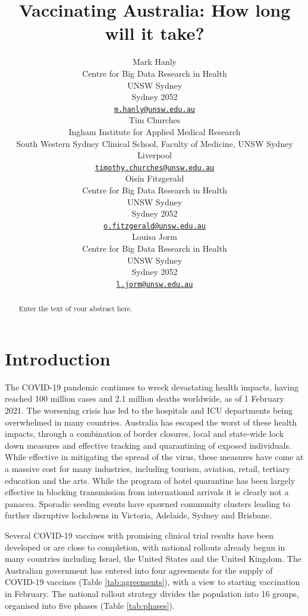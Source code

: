 \documentclass{article}
\title{Vaccinating Australia: How long will it take?}
\author{
    Mark Hanly
   \\
    Centre for Big Data Research in Health \\
    UNSW Sydney \\
  Sydney 2052 \\
  \texttt{\href{mailto:m.hanly@unsw.edu.au}{\nolinkurl{m.hanly@unsw.edu.au}}} \\
   \And
    Tim Churches
   \\
    Ingham Institute for Applied Medical Research \\
    South Western Sydney Clinical School, Faculty of Medicine, UNSW Sydney \\
  Liverpool \\
  \texttt{\href{mailto:timothy.churches@unsw.edu.au}{\nolinkurl{timothy.churches@unsw.edu.au}}} \\
   \And
    Oisín Fitzgerald
   \\
    Centre for Big Data Research in Health \\
    UNSW Sydney \\
  Sydney 2052 \\
  \texttt{\href{mailto:o.fitzgerald@unsw.edu.au}{\nolinkurl{o.fitzgerald@unsw.edu.au}}} \\
   \And
    Louisa Jorm
   \\
    Centre for Big Data Research in Health \\
    UNSW Sydney \\
  Sydney 2052 \\
  \texttt{\href{mailto:l.jorm@unsw.edu.au}{\nolinkurl{l.jorm@unsw.edu.au}}} \\
  }
\begin{document}
\maketitle

\def\tightlist{}


\begin{abstract}
Enter the text of your abstract here.
\end{abstract}


\hypertarget{introduction}{%
\section{Introduction}\label{introduction}}

The COVID-19 pandemic continues to wreck devastating health impacts,
having reached 100 million cases and 2.1 million deaths worldwide, as of
1 February 2021. The worsening crisis has led to the hospitals and ICU
departments being overwhelmed in many countries. Australia has escaped
the worst of these health impacts, through a combination of border
closures, local and state-wide lock down measures and effective tracking
and quarantining of exposed individuals. While effective in mitigating
the spread of the virus, these measures have come at a massive cost for
many industries, including tourism, aviation, retail, tertiary education
and the arts. While the program of hotel quarantine has been largely
effective in blocking transmission from international arrivals it is
clearly not a panacea. Sporadic seeding events have spawned community
clusters leading to further disruptive lockdowns in Victoria, Adelaide,
Sydney and Brisbane.

Several COVID-19 vaccines with promising clinical trial results have
been developed or are close to completion, with national rollouts
already begun in many countries including Israel, the United States and
the United Kingdom. The Australian government has entered into four
agreements for the supply of COVID-19 vaccines (Table
\ref{tab:agreements}), with a view to starting vaccination in February.
The national rollout strategy divides the population into 16 groups,
organised into five phases (Table \ref{tab:phases}).\\
\end{document}
